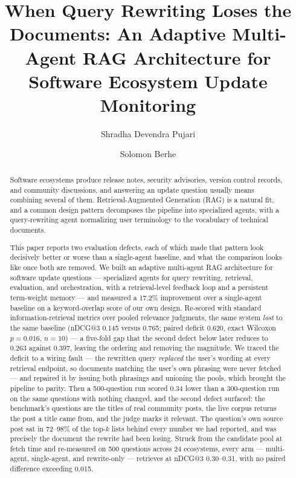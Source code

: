 \documentclass[acmsmall,review,anonymous,screen]{acmart}
\title[When Query Rewriting Loses the Documents]{When Query Rewriting Loses the
Documents: An Adaptive Multi-Agent RAG Architecture for Software Ecosystem
Update Monitoring}
\author{Shradha Devendra Pujari}
\affiliation{%
  \institution{University of the Pacific}
  \department{Department of Computer Science}
  \city{Stockton}
  \state{CA}
  \country{USA}}
\author{Solomon Berhe}
\affiliation{%
  \institution{University of the Pacific}
  \department{Department of Computer Science}
  \city{Stockton}
  \state{CA}
  \country{USA}}
\begin{document}
\begin{abstract}
Software ecosystems produce release notes, security advisories, version control
records, and community discussions, and answering an update question usually means combining several of them. Retrieval-Augmented
Generation (RAG) is a natural fit, and a common design pattern decomposes the
pipeline into specialized agents, with a query-rewriting agent normalizing user
terminology to the vocabulary of technical documents.

This paper reports two evaluation defects, each of which made that pattern
look decisively better or worse than a single-agent baseline, and what the
comparison looks like once both are removed. We built an adaptive multi-agent
RAG architecture for software update questions --- specialized agents for query
rewriting, retrieval, evaluation, and orchestration, with a retrieval-level
feedback loop and a persistent term-weight memory --- and measured a 17.2\%
improvement over a single-agent baseline on a keyword-overlap score of our own
design. Re-scored with standard
information-retrieval metrics over pooled relevance judgments, the same system
\emph{lost} to the same baseline (nDCG@3 0.145 versus 0.765; paired deficit
0.620, exact Wilcoxon $p=0.016$, $n=10$) --- a five-fold gap that the second
defect below later reduces to 0.263 against 0.397, leaving the ordering and
removing the magnitude. We traced the deficit to a wiring
fault --- the rewritten query \emph{replaced} the user's wording at every
retrieval endpoint, so documents matching the user's own phrasing were never
fetched --- and repaired it by issuing both phrasings and unioning the pools,
which brought the pipeline to parity. Then a 500-question run scored 0.34 lower
than a 300-question run on the same questions with nothing changed, and the
second defect surfaced: the benchmark's questions are the titles of real
community posts, the live corpus returns the post a title came from, and the
judge marks it relevant. The question's own source post sat in 72--98\% of
the top-$k$ lists behind every number we had reported, and was precisely the
document the rewrite had been losing. Struck from the candidate
pool at fetch time and re-measured on 500 questions across 24 ecosystems, every
arm --- multi-agent, single-agent, and rewrite-only --- retrieves at nDCG@3
0.30--0.31, with no paired difference exceeding 0.015.


\end{abstract}
\end{document}
